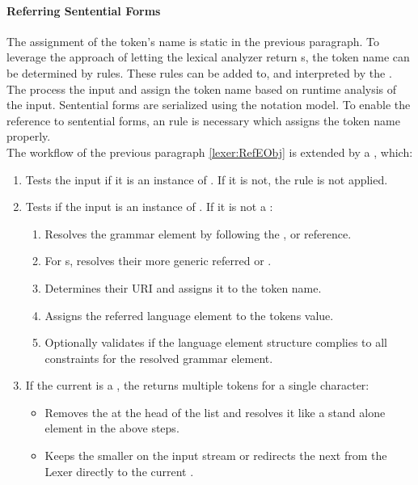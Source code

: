 \paragraph{Referring Sentential Forms}
The assignment of the token's name is  static in the previous paragraph. To leverage the approach of letting the lexical analyzer return s, the token name can be determined by rules. These rules can be added to, and interpreted by the . The  process the input  and assign the token name based on runtime analysis of the input. Sentential forms are serialized using the notation model. To enable the reference to sentential forms, an  rule is necessary which assigns the token name properly. \\
The workflow of the previous paragraph \ref{lexer:RefEObj} is extended by a , which:
\begin{enumerate}
	\item Tests the input  if it is an instance of . If it is not, the rule is not applied.
	\item Tests if the input is an instance of . 
	If it is not a :
	\begin{enumerate}
		\item Resolves the grammar element by following the ,  or  reference. 
		\item For s, resolves their more generic referred  or .
		\item Determines their URI and assigns it to the token name.
		\item Assigns the referred language element  to the tokens value.
		\item Optionally validates if the language element structure complies to all constraints for the resolved grammar element.
	\end{enumerate}
	\item If the current  is a , the  returns multiple tokens for a single character:
	\begin{itemize}
		\item Removes the  at the head of the list and resolves it like a stand alone element in the above steps.
		\item Keeps the smaller  on the input stream or redirects the next  from the Lexer directly to the current .  \\
	\end{itemize}
\end{enumerate}

